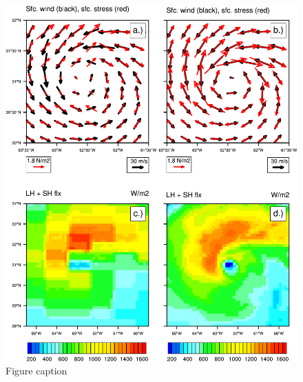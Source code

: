 \documentclass[draft,ms]{AGUTeX}
\begin{document}

\newpage

\begin{figure}
\includegraphics[width=0.8\linewidth]{fig_compareStress.pdf}
\caption{Figure caption}
\label{fig:forecast_panels}
\end{figure}

\end{document}
